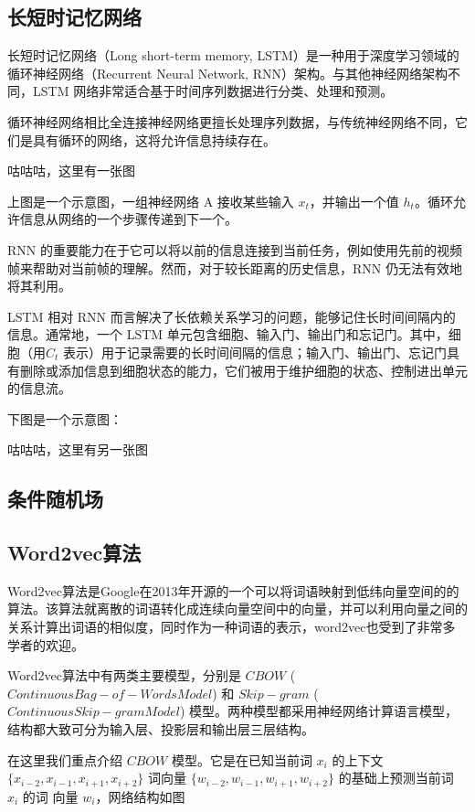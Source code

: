 \subsection{长短时记忆网络}

长短时记忆网络（Long short-term memory, LSTM）是一种用于深度学习领域的循环神经网络（Recurrent Neural Network, RNN）架构。与其他神经网络架构不同，LSTM 网络非常适合基于时间序列数据进行分类、处理和预测。

循环神经网络相比全连接神经网络更擅长处理序列数据，与传统神经网络不同，它们是具有循环的网络，这将允许信息持续存在。

咕咕咕，这里有一张图

上图是一个示意图，一组神经网络 A 接收某些输入 ${\displaystyle x_t}$，并输出一个值 ${\displaystyle h_t}$。循环允许信息从网络的一个步骤传递到下一个。

RNN 的重要能力在于它可以将以前的信息连接到当前任务，例如使用先前的视频帧来帮助对当前帧的理解。然而，对于较长距离的历史信息，RNN 仍无法有效地将其利用。

LSTM 相对 RNN 而言解决了长依赖关系学习的问题，能够记住长时间间隔内的信息。通常地，一个 LSTM 单元包含细胞、输入门、输出门和忘记门。其中，细胞（用${\displaystyle C_t}$ 表示）用于记录需要的长时间间隔的信息；输入门、输出门、忘记门具有删除或添加信息到细胞状态的能力，它们被用于维护细胞的状态、控制进出单元的信息流。

下图是一个示意图：

咕咕咕，这里有另一张图
\fi

\subsection{条件随机场}

\subsection{Word2vec算法}
Word2vec算法是Google在2013年开源的一个可以将词语映射到低纬向量空间的的算法。该算法就离散的词语转化成连续向量空间中的向量，并可以利用向量之间的关系计算出词语的相似度，同时作为一种词语的表示，word2vec也受到了非常多学者的欢迎。

Word2vec算法中有两类主要模型，分别是 $CBOW$ ($Continuous Bag-of-Words Model$) 和 $Skip-gram$ ($Continuous Skip-gram Model$) 模型。两种模型都采用神经网络计算语言模型，结构都大致可分为输入层、投影层和输出层三层结构。

在这里我们重点介绍 $CBOW$ 模型。它是在已知当前词 $x_i$ 的上下文 $\{x_{i−2}, x_{i−1}, x_{i+1}, x_{i+2}\}$ 词向量 $\{w_{i−2}, w_{i−1}, w_{i+1}, w_{i+2}\}$ 的基础上预测当前词 $x_i$ 的词 向量 $w_i$，网络结构如图

